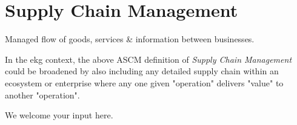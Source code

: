 \section{Supply Chain Management}\label{sec:ekgmm-a-3-3}

Managed flow of goods, services \& information between businesses.


\ekgmmContextSection

In the \gls{ekg} context, the above ASCM definition of \textit{Supply Chain Management} could be broadened
by also including any detailed supply chain within an ecosystem or enterprise where any one given "operation"
delivers "value" to another "operation".


We welcome your input here.

